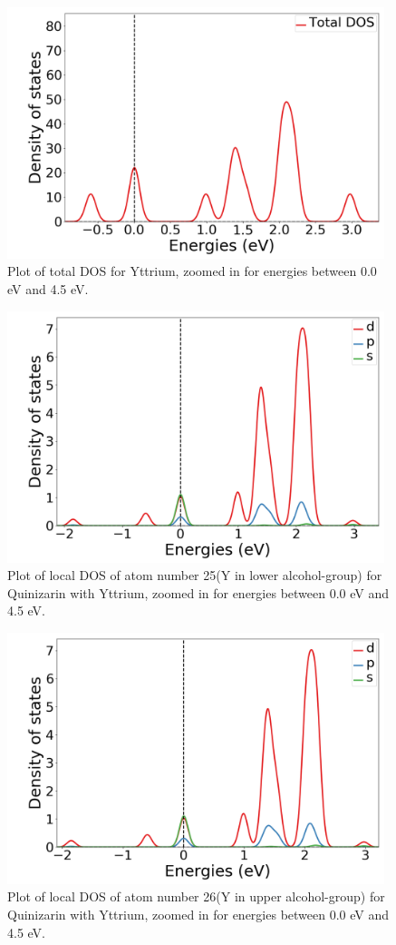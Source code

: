 \documentclass{article}
\begin{document}
      \begin{figure}[H]
        \centering
        \includegraphics[width = 11cm]{../fig/Y_TDOS_2.png}
        \caption{Plot of total DOS for Yttrium, zoomed in for energies between 0.0 eV and 4.5 eV. }
        \label{fig:Y_TDOS_2}
      \end{figure}

      \begin{figure}[H]
        \centering
        \includegraphics[width = 11cm]{../fig/Y_LDOS25_2.png}
        \caption{Plot of local DOS of atom number 25(Y in lower alcohol-group) for Quinizarin with Yttrium, zoomed in for energies between 0.0 eV and 4.5 eV. }
        \label{fig:Y_LDOS25_2}
      \end{figure}

      \begin{figure}[H]
          \centering
          \includegraphics[width = 11cm]{../fig/Y_LDOS26_2.png}
          \caption{Plot of local DOS of atom number 26(Y in upper alcohol-group) for Quinizarin with Yttrium, zoomed in for energies between 0.0 eV and 4.5 eV. }
          \label{fig:Y_LDOS26_2}
      \end{figure}
\end{document}
